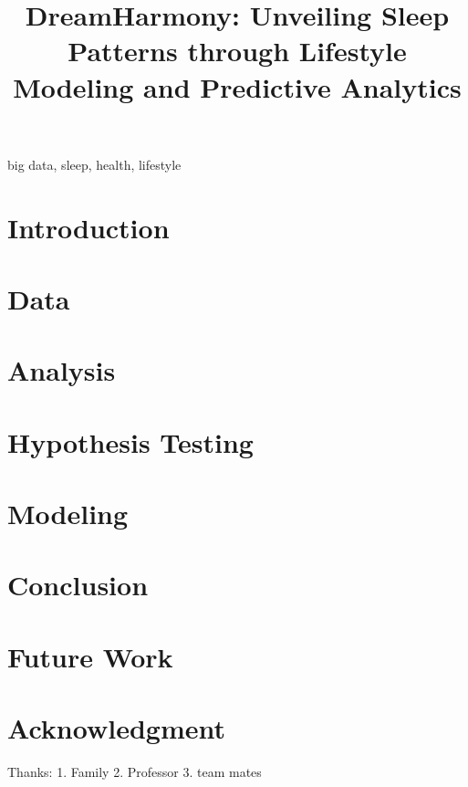 \documentclass[conference]{IEEEtran}
\begin{document}

\title{DreamHarmony: Unveiling Sleep Patterns through Lifestyle Modeling and Predictive Analytics
}


\author{
\and
{}
\and
{}
}

\maketitle

\begin{abstract}
\cite{lithuanian}
\end{abstract}

\begin{IEEEkeywords}
big data, sleep, health, lifestyle
\end{IEEEkeywords}

\section{Introduction}
\section{Data}
\section{Analysis}
\section{Hypothesis Testing}
\section{Modeling}
\section{Conclusion}
\section{Future Work}

\section*{Acknowledgment}
Thanks:
1. Family
2. Professor
3. team mates


\end{document}
